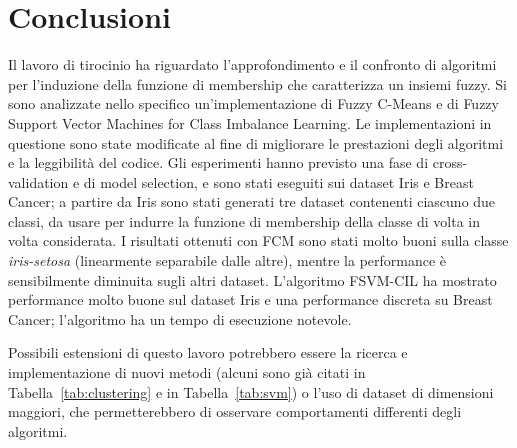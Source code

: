 \documentclass[oneside, openany]{book}
\begin{document}
	\chapter*{Conclusioni}
	Il lavoro di tirocinio ha riguardato l'approfondimento e il confronto di algoritmi per l'induzione della funzione di membership che caratterizza un insiemi fuzzy. Si sono analizzate nello specifico un'implementazione di Fuzzy C-Means e di Fuzzy Support Vector Machines for Class Imbalance Learning. Le implementazioni in questione sono state modificate al fine di migliorare le prestazioni degli algoritmi e la leggibilità del codice. Gli esperimenti hanno previsto una fase di cross-validation e di model selection, e sono stati eseguiti sui dataset Iris e Breast Cancer; a partire da Iris sono stati generati tre dataset contenenti ciascuno due classi, da usare per indurre la funzione di membership della classe di volta in volta considerata. I risultati ottenuti con FCM sono stati molto buoni sulla classe \textit{iris-setosa} (linearmente separabile dalle altre), mentre la performance è sensibilmente diminuita sugli altri dataset. L'algoritmo FSVM-CIL ha mostrato performance molto buone sul dataset Iris e una performance discreta su Breast Cancer; l'algoritmo ha un tempo di esecuzione notevole.
	
	Possibili estensioni di questo lavoro potrebbero essere la ricerca e implementazione di nuovi metodi (alcuni sono già citati in Tabella~\ref{tab:clustering} e in Tabella~\ref{tab:svm}) o l'uso di dataset di dimensioni maggiori, che permetterebbero di osservare comportamenti differenti degli algoritmi.
	
	{}
\end{document}
